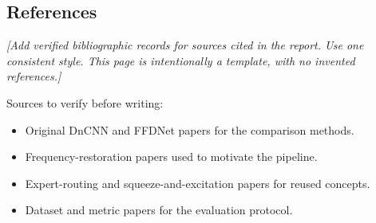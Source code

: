 \documentclass[12pt,a4paper,oneside]{NITR}
\begin{document}

\coverPage
\titlePage
\certificateOfExamination
\certificateOneSupervisor
\declaration
\abstract
\begin{singlespace}
\tableofcontents
\cleardoublepage
\end{singlespace}
\cleardoublepage
{}
\pagestyle{fancy}
\renewcommand{\chaptermark}[1]{\markboth{#1}{}}
\renewcommand{\sectionmark}[1]{\markright{\textbf{Chapter \thechapter}}}

\cleardoublepage

\cleardoublepage

\cleardoublepage
{}
\lhead{}
\renewcommand\bibname{References}

\begin{singlespace}
\chapter*{References}
\textit{[Add verified bibliographic records for sources cited in the report. Use one consistent style. This page is intentionally a template, with no invented references.]}

\medskip
\noindent Sources to verify before writing:
\begin{itemize}
\item Original DnCNN and FFDNet papers for the comparison methods.
\item Frequency-restoration papers used to motivate the pipeline.
\item Expert-routing and squeeze-and-excitation papers for reused concepts.
\item Dataset and metric papers for the evaluation protocol.
\end{itemize}
\end{singlespace}
\cleardoublepage
\end{document}
